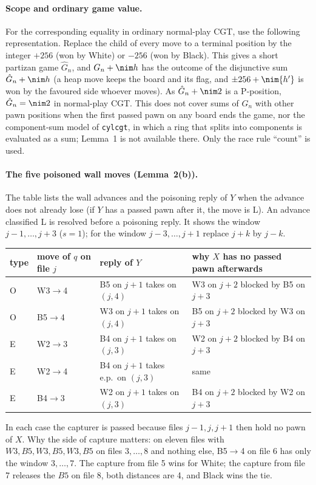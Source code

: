 \paragraph{Scope and ordinary game value.}
For the corresponding equality in ordinary normal-play CGT, use the following representation. Replace the child of every move
to a terminal position by the integer $+256$ (won by White) or $-256$ (won by Black). This gives a short partizan game $\hat G_n$, and
$G_n+\nim h$ has the outcome of the disjunctive sum $\hat G_n+\nim h$ (a heap move keeps the board and its flag, and $\pm256+\nim{h'}$ is won
by the favoured side whoever moves). As $\hat G_n+\nim2$ is a P-position, $\hat G_n=\nim2$ in normal-play CGT. This does not cover sums of
$G_n$ with other pawn positions when the first passed pawn on any board ends the game, nor the component-sum model of \texttt{cylcgt},
in which a ring that splits into components is evaluated as a sum; Lemma~1 is not available there. Only the race rule ``count'' is used.

\paragraph{The five poisoned wall moves (Lemma~2(b)).}
The table lists the wall advances and the poisoning reply of $Y$ when the advance does not already lose (if $Y$ has a passed pawn after
it, the move is L). An advance classified L is resolved before a poisoning reply. It shows the window $j-1,\dots,j+3$ ($s=1$); for the window $j-3,\dots,j+1$ replace $j+k$ by $j-k$.
\begin{center}\small
\begin{tabular}{llll}
type & move of $q$ on file $j$ & reply of $Y$ & why $X$ has no passed pawn afterwards\\\hline
O & W3$\to$4 & B5 on $j{+}1$ takes on $(j,4)$ & W3 on $j{+}2$ blocked by B5 on $j{+}3$\\
O & B5$\to$4 & W3 on $j{+}1$ takes on $(j,4)$ & B5 on $j{+}2$ blocked by W3 on $j{+}3$\\
E & W2$\to$3 & B4 on $j{+}1$ takes on $(j,3)$ & W2 on $j{+}2$ blocked by B4 on $j{+}3$\\
E & W2$\to$4 & B4 on $j{+}1$ takes e.p.\ on $(j,3)$ & same\\
E & B4$\to$3 & W2 on $j{+}1$ takes on $(j,3)$ & B4 on $j{+}2$ blocked by W2 on $j{+}3$\\
\end{tabular}
\end{center}
In each case the capturer is passed because files $j-1,j,j+1$ then hold no pawn of $X$. Why the side of capture matters: on eleven files with
$W3,B5,W3,B5,W3,B5$ on files $3,\dots,8$ and nothing else, B5$\to$4 on file 6 has only the window $3,\dots,7$. The capture from file 5
wins for White; the capture from file 7 releases the $B5$ on file 8, both distances are 4, and Black wins the tie.

